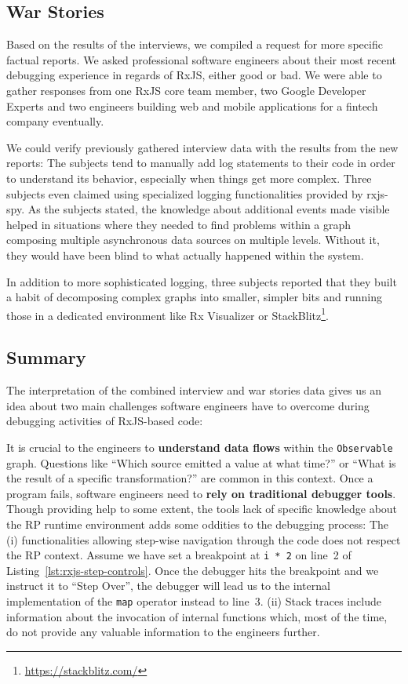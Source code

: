 \documentclass[12pt,a4paper]{article}
\begin{document}
\subsection{War Stories}

Based on the results of the interviews, we compiled a request for more specific factual reports. We asked professional software engineers about their most recent debugging experience in regards of RxJS, either good or bad. We were able to gather responses from one RxJS core team member, two Google Developer Experts and two engineers building web and mobile applications for a fintech company eventually.

We could verify previously gathered interview data with the results from the new reports: The subjects tend to manually add log statements to their code in order to understand its behavior, especially when things get more complex. Three subjects even claimed using specialized logging functionalities provided by rxjs-spy\cite{rxjsspy}. As the subjects stated, the knowledge about additional events made visible helped in situations where they needed to find problems within a graph composing multiple asynchronous data sources on multiple levels. Without it, they would have been blind to what actually happened within the system.

In addition to more sophisticated logging, three subjects reported that they built a habit of decomposing complex graphs into smaller, simpler bits and running those in a dedicated environment like Rx Visualizer\cite{rxviz} or StackBlitz\footnote{\url{https://stackblitz.com/}}.

\subsection{Summary}

The interpretation of the combined interview and war stories data gives us an idea about two main challenges software engineers have to overcome during debugging activities of RxJS-based code:

It is crucial to the engineers to \textbf{understand data flows}  within the \texttt{Observable} graph. Questions like ``Which source emitted a value at what time?'' or ``What is the result of a specific transformation?'' are common in this context. Once a program fails, software engineers need to \textbf{rely on traditional debugger tools}. Though providing help to some extent, the tools lack of specific knowledge about the RP runtime environment adds some oddities to the debugging process: The (i) functionalities allowing step-wise navigation through the code does not respect the RP context. Assume we have set a breakpoint at \texttt{i * 2} on line~2 of Listing~\ref{lst:rxjs-step-controls}. Once the debugger hits the breakpoint and we instruct it to ``Step Over'', the debugger will lead us to the internal implementation of the \texttt{map} operator instead to line~3. (ii) Stack traces include information about the invocation of internal functions which, most of the time, do not provide any valuable information to the engineers further.
\end{document}

